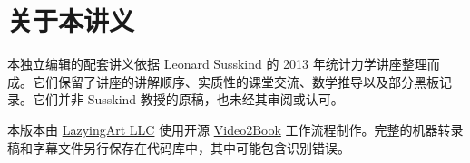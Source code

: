 \documentclass[11pt,oneside]{book}
\begin{document}
\frontmatter
\hypersetup{pageanchor=false}

\hypersetup{pageanchor=true}

\chapter*{关于本讲义}
本独立编辑的配套讲义依据 Leonard Susskind 的 2013 年统计力学讲座整理而成。它们保留了讲座的讲解顺序、实质性的课堂交流、数学推导以及部分黑板记录。它们并非 Susskind 教授的原稿，也未经其审阅或认可。

本版本由 \href{https://lazying.art}{LazyingArt LLC} 使用开源 \href{https://github.com/lachlanchen/Video2Book}{Video2Book} 工作流程制作。完整的机器转录稿和字幕文件另行保存在代码库中，其中可能包含识别错误。
\clearpage
\tableofcontents
\mainmatter










\end{document}
